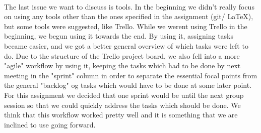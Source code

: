 \documentclass{article}
\begin{document}
\noindent \\
The last issue we want to discuss is tools. In the beginning we didn't really focus on using any tools other than the ones specified in the assignment (git/ LaTeX), but some tools were suggested, like Trello. While we werent using Trello in the beginning, we begun using it towards the end. By using it, assigning tasks became easier, and we got a better general overview of which tasks were left to do. Due to the structure of the Trello project board, we also fell into a more "agile" workflow by using it, keeping the tasks which had to be done by next meeting in the "sprint" column in order to separate the essential focal points from the general "backlog" og tasks which would have to be done at some later point. For this assignment we decided that one sprint would be until the next group session so that we could quickly address the tasks which should be done. We think that this workflow worked pretty well and it is something that we are inclined to use going forward.
\end{document}
